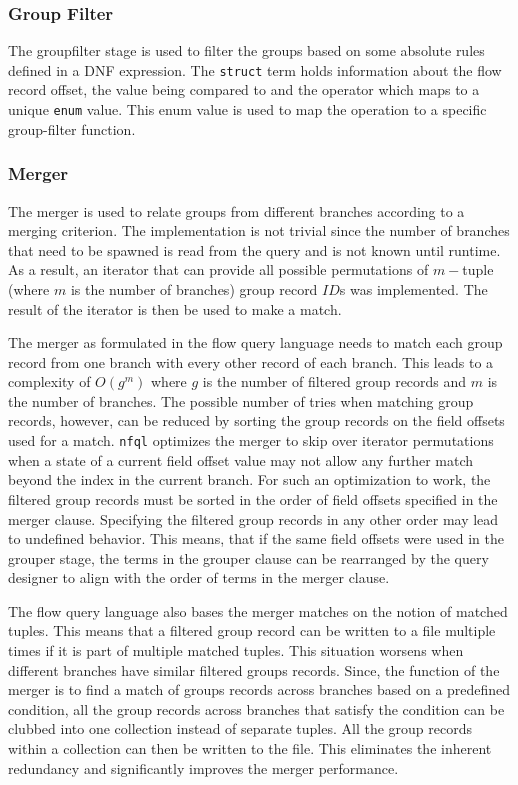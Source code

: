 \subsubsection{Group Filter} The groupfilter stage is used to filter the
groups based on some absolute rules defined in a \ac{DNF} expression. The
\texttt{struct} term holds information about the flow record offset, the value
being compared to and the operator which maps to a unique \texttt{enum} value.
This enum value is used to map the operation to a specific group-filter
function.

\subsubsection{Merger}

The merger is used to relate groups from different branches according to a
merging criterion. The implementation is not trivial since the number of
branches that need to be spawned is read from the query and is not known until
runtime. As a result, an iterator that can provide all possible permutations
of $m-$tuple (where $m$ is the number of branches) group record $ID$s was
implemented. The result of the iterator is then be used to make a match.

The merger as formulated in the flow query language needs to match each group
record from one branch with every other record of each branch. This leads to a
complexity of $O(g^m)$ where $g$ is the number of filtered group records and
$m$ is the number of branches. The possible number of tries when matching
group records, however, can be reduced by sorting the group records on the
field offsets used for a match. \texttt{nfql} optimizes the merger to skip
over iterator permutations when a state of a current field offset value may
not allow any further match beyond the index in the current branch.  For such
an optimization to work, the filtered group records must be sorted in the
order of field offsets specified in the merger clause.  Specifying the
filtered group records in any other order may lead to undefined behavior. This
means, that if the same field offsets were used in the grouper stage, the
terms in the grouper clause can be rearranged by the query designer to align
with the order of terms in the merger clause.

The flow query language also bases the merger matches on the notion of matched
tuples. This means that a filtered group record can be written to a file
multiple times if it is part of multiple matched tuples. This situation
worsens when different branches have similar filtered groups records. Since,
the function of the merger is to find a match of groups records across
branches based on a predefined condition, all the group records across
branches that satisfy the condition can be clubbed into one collection instead
of separate tuples. All the group records within a collection can then be
written to the file. This eliminates the inherent redundancy and significantly
improves the merger performance.

